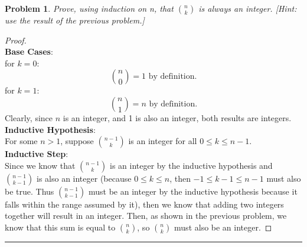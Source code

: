 \documentclass{article}
\theoremstyle{upright}
\newtheorem{problem}{Problem}
\def \proofDistance {5pt}
\newcommand{\proofseparator}{\par\noindent\rule{\textwidth}{0.4pt}}
\newcommand{\pf}[1]{
    \vspace{\proofDistance}
    \begin{proof}
    #1
    \end{proof}
    \proofseparator
}
\begin{document}
\newpage 

\begin{problem}
    Prove, using induction on n, that $\displaystyle \binom{n}{k}$ is always an integer. [Hint: use the result of the previous problem.] 
\end{problem}

\pf{ \hfill \\

    \indent \textbf{Base Cases}: \\
    for $k = 0$: \\
    $$\binom{n}{0} = 1 \text{ by definition.}$$
    for $k = 1$: \\
    $$\binom{n}{1} = n \text{ by definition.}$$
    Clearly, since $n$ is an integer, and 1 is also an integer, both results are integers. \\
    
    \textbf{Inductive Hypothesis}: \\
    For some $n > 1$, suppose $\binom{n-1}{k}$ is an integer for all $0 \leq k \leq n -1$. \\

    \textbf{Inductive Step}: \\
    Since we know that $\binom{n-1}{k}$ is an integer by the inductive hypothesis and $\binom{n - 1}{k - 1}$ is also an integer (because $0 \leq k \leq n$, then $-1 \leq k - 1\leq n - 1$ must also be true. Thus $\binom{n-1}{k-1}$ must be an integer by the inductive hypothesis because it falls within the range assumed by it), then we know that adding two integers together will result in an integer. Then, as shown in the previous problem, we know that this sum is equal to $\binom{n}{k}$, so $\binom{n}{k}$ must also be an integer.
}
\end{document}
